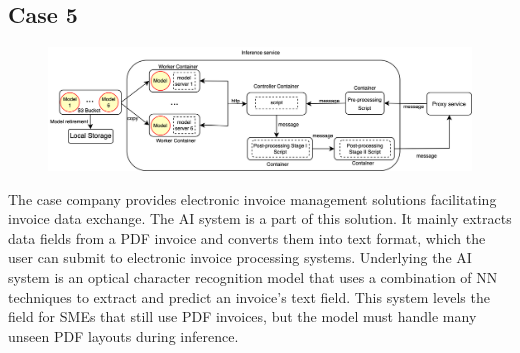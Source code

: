 \subsection*{Case 5} %
\label{case: 5} 
\DIFaddbegin \begin{figure}[b]
\centering
\includegraphics[width=\linewidth]{images/case5_deployment_process.png}
\caption{}
\label{fig: case5_deployment_process}
\end{figure}

\DIFaddend %
\DIFdelbegin %

{%
}
\DIFdelend 

The case company provides electronic invoice management solutions facilitating invoice data exchange. The AI system is a part of this solution. It mainly extracts data fields from a PDF invoice and converts them into text format, which the user can submit to electronic invoice processing systems. Underlying the AI system is an optical character recognition model that uses a combination of NN techniques to extract and predict an invoice’s text field. This system levels the field for SMEs that still use PDF invoices, but the model must handle many unseen PDF layouts during inference.


